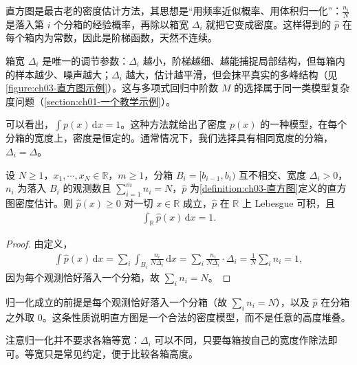 \documentclass[../../main.tex]{subfiles}
\begin{document}
\begin{remark}
直方图是最古老的密度估计方法，其思想是“用频率近似概率、用体积归一化”：$\frac{n_i}{N}$ 是落入第 $i$ 个分箱的经验概率，再除以箱宽 $\Delta_i$ 就把它变成密度。这样得到的 $\hat{p}$ 在每个箱内为常数，因此是阶梯函数，天然不连续。

箱宽 $\Delta_i$ 是唯一的调节参数：$\Delta_i$ 越小，阶梯越细、越能捕捉局部结构，但每箱内的样本越少、噪声越大；$\Delta_i$ 越大，估计越平滑，但会抹平真实的多峰结构（见\cref{figure:ch03-直方图示例}）。这与多项式回归中阶数 $M$ 的选择属于同一类模型复杂度问题（\cref{section:ch01-一个教学示例}）。
\end{remark}

可以看出，$\int p(x)\,\mathrm{d}x=1$。这种方法就给出了密度 $p(x)$ 的一种模型，在每个分箱的宽度上，密度是恒定的。通常情况下，我们选择具有相同宽度的分箱，$\Delta_i=\Delta$。

\begin{proposition}[直方图密度的归一性]\label{proposition:ch03-直方图归一}
设 $N\geqslant1$，$x_1,\cdots,x_N\in\mathbb{R}$，$m\geqslant1$，分箱 $B_i=[b_{i-1},b_i)$ 互不相交、宽度 $\Delta_i>0$，$n_i$ 为落入 $B_i$ 的观测数且 $\sum_{i=1}^{m}n_i=N$，$\hat{p}$ 为\cref{definition:ch03-直方图}定义的直方图密度估计。则 $\hat{p}(x)\geqslant0$ 对一切 $x\in\mathbb{R}$ 成立，$\hat{p}$ 在 $\mathbb{R}$ 上 Lebesgue 可积，且
\begin{align*}
\int_{\mathbb{R}}\hat{p}(x)\,\mathrm{d}x=1.
\end{align*}
\end{proposition}
\begin{proof}
由定义，
\begin{align*}
\int\hat{p}(x)\,\mathrm{d}x=\sum_i\int_{B_i}\frac{n_i}{N\Delta_i}\,\mathrm{d}x=\sum_i\frac{n_i}{N\Delta_i}\cdot\Delta_i=\frac{1}{N}\sum_i n_i=1,
\end{align*}
因为每个观测恰好落入一个分箱，故 $\sum_i n_i=N$。
\end{proof}

\begin{remark}
归一化成立的前提是每个观测恰好落入一个分箱（故 $\sum_i n_i=N$），以及 $\hat{p}$ 在分箱之外取 $0$。这条性质说明直方图是一个合法的密度模型，而不是任意的高度堆叠。

注意归一化并不要求各箱等宽：$\Delta_i$ 可以不同，只要每箱按自己的宽度作除法即可。等宽只是常见约定，便于比较各箱高度。
\end{remark}
\end{document}
